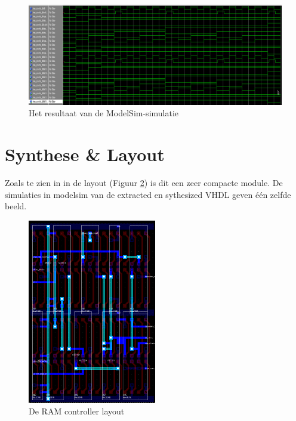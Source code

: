\documentclass{scrreprt} %
\begin{document}
\begin{figure}[H]
\centering
	\includegraphics[width=\textwidth]{resources/wave-narrow.png}
	\caption{Het resultaat van de ModelSim-simulatie}
	\label{fig:ramcontroller-sim}
\end{figure}

\section{Synthese \& Layout}
Zoals te zien in in de layout (Figuur \ref{fig:ramcontroller-layout}) is dit een zeer compacte module. De simulaties in modelsim van de extracted en sythesized VHDL geven één zelfde beeld.

\begin{figure}[H]
\centering
	\includegraphics[width=0.5\textwidth]{resources/layout_ramcontroller.png}
	\caption{De RAM controller layout}
	\label{fig:ramcontroller-layout}
\end{figure}

\end{document}
